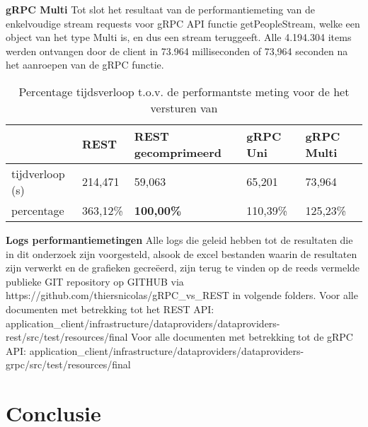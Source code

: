 \textbf{gRPC Multi}\newline
Tot slot het resultaat van de performantiemeting van de enkelvoudige stream requests voor gRPC API functie getPeopleStream,
welke een object van het type Multi is, en dus een stream teruggeeft. Alle 4.194.304 items werden ontvangen door de client in 73.964 milliseconden of 73,964 seconden
na het aanroepen van de gRPC functie.\\

\begin{table}
    \centering
    \begin{tabular}{lllll}
        \toprule
        \textbf{} & \textbf{REST} & \textbf{REST gecomprimeerd} & \textbf{gRPC Uni} & \textbf{gRPC Multi} \\
        \midrule
        tijdverloop (s) & 214,471 & 59,063 & 65,201 & 73,964 \\
        percentage & 363,12\% & \textbf{100,00\%} & 110,39\% & 125,23\% \\
        \bottomrule
    \end{tabular}
    \caption{Percentage tijdsverloop t.o.v. de performantste meting voor de het versturen van }
    \label{tab:REST_RESTgecomprimeerd_gRPCUni_gRPCmultimeervoudig}
\end{table}


\textbf{Logs performantiemetingen}\newline
Alle logs die geleid hebben tot de resultaten die in dit onderzoek zijn voorgesteld, alsook de excel bestanden waarin de resultaten zijn verwerkt en de grafieken gecre\"eerd,
zijn terug te vinden op de reeds vermelde publieke GIT repository op GITHUB via https://github.com/thiersnicolas/gRPC\_vs\_REST in volgende folders.\newline
Voor alle documenten met betrekking tot het REST API:\newline
application\_client/infrastructure/dataproviders/dataproviders-rest/src/test/resources/final\newline
Voor alle documenten met betrekking tot de gRPC API:\newline
application\_client/infrastructure/dataproviders/dataproviders-grpc/src/test/resources/final\\

\section{Conclusie}

